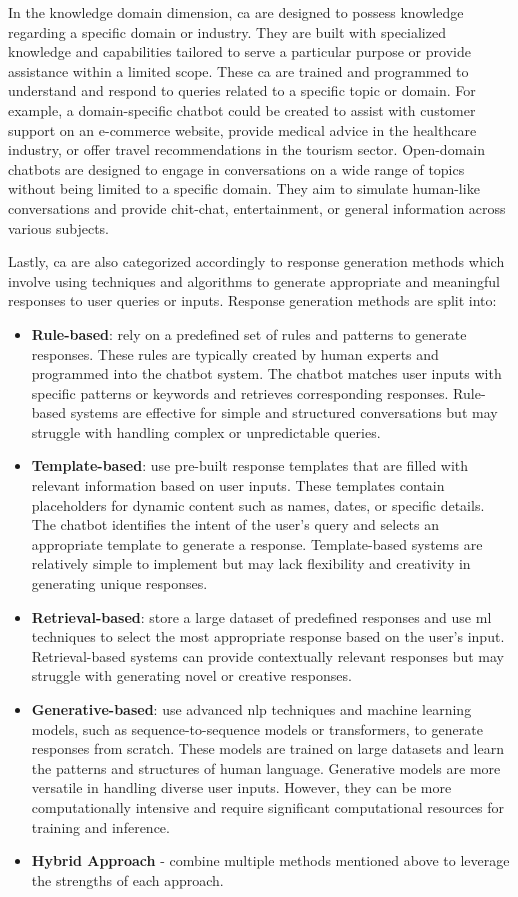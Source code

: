 \documentclass[a4paper,fleqn]{cas-dc}
\begin{document}
In the knowledge domain dimension, \gls{ca} are designed to possess knowledge regarding a specific domain or industry. They are built with specialized knowledge and capabilities tailored to serve a particular purpose or provide assistance within a limited scope. These \gls{ca} are trained and programmed to understand and respond to queries related to a specific topic or domain. For example, a domain-specific chatbot could be created to assist with customer support on an e-commerce website, provide medical advice in the healthcare industry, or offer travel recommendations in the tourism sector. Open-domain chatbots are designed to engage in conversations on a wide range of topics without being limited to a specific domain. They aim to simulate human-like conversations and provide chit-chat, entertainment, or general information across various subjects.

Lastly, \gls{ca} are also categorized accordingly to response generation methods which involve using techniques and algorithms to generate appropriate and meaningful responses to user queries or inputs. Response generation methods are split into:
\begin{itemize}
	\item \textbf{Rule-based}: rely on a predefined set of rules and patterns to generate responses. These rules are typically created by human experts and programmed into the chatbot system. The chatbot matches user inputs with specific patterns or keywords and retrieves corresponding responses. Rule-based systems are effective for simple and structured conversations but may struggle with handling complex or unpredictable queries.
	\item \textbf{Template-based}: use pre-built response templates that are filled with relevant information based on user inputs. These templates contain placeholders for dynamic content such as names, dates, or specific details. The chatbot identifies the intent of the user's query and selects an appropriate template to generate a response. Template-based systems are relatively simple to implement but may lack flexibility and creativity in generating unique responses.
	\item \textbf{Retrieval-based}: store a large dataset of predefined responses and use \gls{ml} techniques to select the most appropriate response based on the user's input. Retrieval-based systems can provide contextually relevant responses but may struggle with generating novel or creative responses.
	\item \textbf{Generative-based}: use advanced \gls{nlp} techniques and machine learning models, such as sequence-to-sequence models or transformers, to generate responses from scratch. These models are trained on large datasets and learn the patterns and structures of human language. Generative models are more versatile in handling diverse user inputs. However, they can be more computationally intensive and require significant computational resources for training and inference.
	\item \textbf{Hybrid Approach} - combine multiple methods mentioned above to leverage the strengths of each approach.
\end{itemize}
\end{document}
